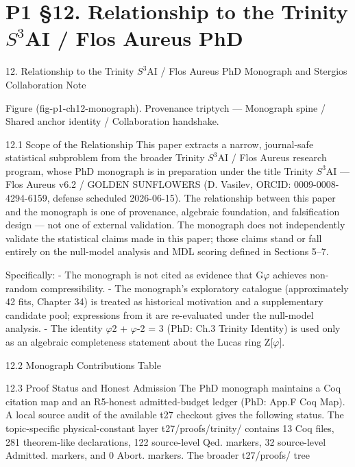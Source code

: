 
\section{P1 §12. Relationship to the Trinity $S^{3}$AI / Flos Aureus PhD}

12. Relationship to the Trinity $S^{3}$AI / Flos Aureus PhD
  Monograph and Stergios Collaboration Note

         Figure (fig-p1-ch12-monograph). Provenance triptych --- Monograph spine / Shared anchor
                                   identity / Collaboration handshake.

  12.1 Scope of the Relationship
  This paper extracts a narrow, journal-safe statistical subproblem from the broader
  Trinity $S^{3}$AI / Flos Aureus research program, whose PhD monograph is in preparation
  under the title Trinity $S^{3}$AI --- Flos Aureus v6.2 / GOLDEN SUNFLOWERS (D. Vasilev,
  ORCID: 0009-0008-4294-6159, defense scheduled 2026-06-15). The relationship
  between this paper and the monograph is one of provenance, algebraic foundation, and
  falsification design --- not one of external validation. The monograph does not
  independently validate the statistical claims made in this paper; those claims stand or
  fall entirely on the null-model analysis and MDL scoring defined in Sections 5--7.

  Specifically:
  - The monograph is not cited as evidence that G$\varphi$ achieves non-random compressibility.
  - The monograph's exploratory catalogue (approximately 42 fits, Chapter 34) is treated
  as historical motivation and a supplementary candidate pool; expressions from it are
  re-evaluated under the null-model analysis.
  - The identity $\varphi$2 + $\varphi$-2 = 3 (PhD: Ch.3 Trinity Identity) is used only as an algebraic
  completeness statement about the Lucas ring Z[$\varphi$].

  12.2 Monograph Contributions Table

  12.3 Proof Status and Honest Admission
  The PhD monograph maintains a Coq citation map and an R5-honest admitted-budget
  ledger (PhD: App.F Coq Map). A local source audit of the available t27 checkout gives
  the following status. The topic-specific physical-constant layer t27/proofs/trinity/
  contains 13 Coq files, 281 theorem-like declarations, 122 source-level Qed. markers, 32
  source-level Admitted. markers, and 0 Abort. markers. The broader t27/proofs/ tree

